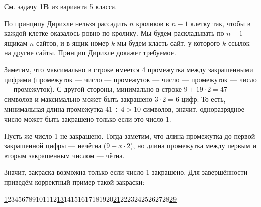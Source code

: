 
\begin{itemize}
\itA См. задачу {\bfseries 1B} из варианта 5 класса.

\itB По принципу Дирихле нельзя рассадить $n$ кроликов в $n-1$ клетку так, 
чтобы в каждой клетке оказалось ровно по кролику.
Мы будем раскладывать по $n-1$ ящикам $n$ сайтов, и в ящик номер $k$ мы будем класть
сайт, у которого $k$ ссылок на другие сайты. Принцип Дирихле докажет требуемое.

\itC Заметим, что максимально в строке имеется 4 промежутка между закрашенными цифрами
(промежуток --- число --- промежуток --- число --- промежуток --- число --- промежуток).
С другой стороны, минимально в строке $9 + 19\cdot 2 = 47$ символов и максимально может 
быть закрашено $3 \cdot 2 = 6$ цифр.
То есть, минимальная длина промежутка $41 \div 4 > 10$ символов, значит, одноразрядное
число может быть закрашено только если это число 1.

Пусть же число 1 не закрашено. Тогда заметим, что длина
промежутка до первой закрашенной цифры --- нечётна ($9 + x \cdot 2$), но длина промежутка
между первым и вторым закрашенным числом --- чётна.

Значит, закраска возможна только если число 1 закрашено.
Для завершённости приведём корректный пример такой закраски:

\begin{center}
{\underline{1}}23456789101112{\underline{13}}14151617181920{\underline{21}}22232425262728{\underline{29}}
\end{center}

\end{itemize}